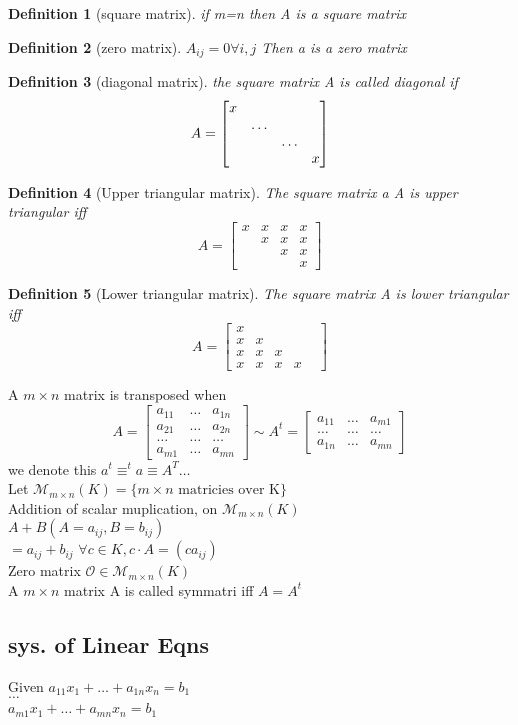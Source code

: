 \documentclass{article}
\newtheorem*{definition}{Definition}
\newcommand\m[1]{\begin{bmatrix}#1\end{bmatrix}}
\newcommand{\cd}{\cdot}
\newcommand{\brac}[1]{\{#1\}}
\begin{document}
\begin{definition}
[square matrix] if m=n then A is a square matrix\\

\end{definition}
\begin{definition}
[zero matrix]$A_{ij}=0 \forall i,j$ Then a is a zero matrix\end{definition}
\begin{definition}
[diagonal matrix] the square matrix A is called diagonal if $$A=\mqty[\dmat{x,\dots,\dots,x}] $$
\end{definition}
\begin{definition}
    [Upper triangular matrix] The square matrix a A is upper triangular iff $$A=\m{x&x&x&x\\&x&x&x\\&&x&x\\&&&x}$$
\end{definition}
\begin{definition}
    [Lower triangular matrix] The square matrix A is lower triangular iff $$A=\m{x&&&\\x&x&&\\x&x&x&&\\x&x&x&x}$$
\end{definition}
A $m\times n$ matrix is transposed when \\
$$A=\m{a_{11} &\dots&a_{1n}\\a_{21}&\dots&a_{2n}\\\dots&\dots&\dots\\ a_{m1}&\dots&a_{mn}}\sim  A^t=\m{a_{11}&\dots& a_{m1}\\\dots&\dots&\dots\\a_{1n}&\dots&a_{mn}}$$
we denote this $a^t\equiv ^ta\equiv A^T\dots$
\\Let $\mathcal{M}_{m\times n}(K)=\brac{m \times n\text{ matricies over K}}$
\\Addition of scalar muplication, on $\mathcal{M}_{m\times n}(K)$\\
$A+B (A=a_{ij},B=b_{ij})$\\
$=a_{ij}+b_{ij}$
$\forall c \in K, c\cd A = (ca_{ij})$
\\Zero matrix $\mathcal{O} \in \mathcal{M}_{m\times n}(K)$
\\A $m \times n $ matrix A is called symmatri iff $A = A^t$
\subsection{sys. of Linear Eqns}
Given $a_{11}x_1+\dots +a_{1n}x_n=b_1$\
\\$\dots$\\$a_{m1}x_1+\dots +a_{mn}x_n=b_1$\
\end{document}
